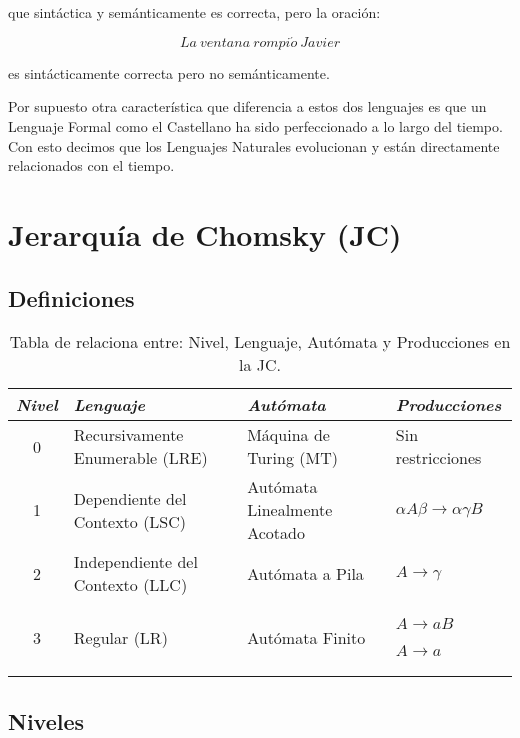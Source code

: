 {que sintáctica y semánticamente es correcta, pero la oración:

\begin{equation}
La\ ventana\ rompi\acute{o}\ Javier 
\end{equation}

es sintácticamente correcta pero no semánticamente.


Por supuesto otra característica que diferencia a estos dos lenguajes es que un
Lenguaje Formal como el Castellano ha sido perfeccionado a lo largo del tiempo.
Con esto decimos que los Lenguajes Naturales evolucionan y están directamente
relacionados con el tiempo.


\section{Jerarquía de Chomsky (JC)}\label{sec:jerarquiaChomsky}

\subsection{Definiciones}

\begin{table}[h]
\begin{center}

\begin{tabular}{|c|l|l|p{}|}\hline
\textit{Nivel} & \textit{Lenguaje} & \textit{Autómata} & \textit{Producciones}
\\ \hline
\hline
0 & Recursivamente Enumerable (LRE) & Máquina de Turing (MT) & Sin restricciones
\\ \hline
1 & Dependiente del Contexto (LSC) & Autómata Linealmente Acotado & $\alpha A
\beta \rightarrow \alpha \gamma B$ \\ \hline
2 & Independiente del Contexto (LLC) & Autómata a Pila & $A \rightarrow \gamma$
\\ \hline
3 & Regular (LR) & Autómata Finito & $A \rightarrow aB$ \par $A \rightarrow a$
\\ \hline
\end{tabular}

\caption{Tabla de relaciona entre: Nivel, Lenguaje, Autómata y Producciones en
la JC.}

\end{center}
\end{table}

\subsection{Niveles}

}
